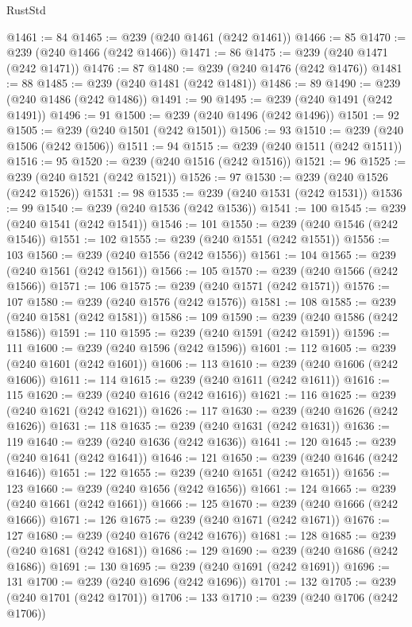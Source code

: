 \begin{lexlean}{RustStd}
\begin{coremodule}
@1461 := 84
@1465 := @239 (@240 @1461 (@242 @1461))
@1466 := 85
@1470 := @239 (@240 @1466 (@242 @1466))
@1471 := 86
@1475 := @239 (@240 @1471 (@242 @1471))
@1476 := 87
@1480 := @239 (@240 @1476 (@242 @1476))
@1481 := 88
@1485 := @239 (@240 @1481 (@242 @1481))
@1486 := 89
@1490 := @239 (@240 @1486 (@242 @1486))
@1491 := 90
@1495 := @239 (@240 @1491 (@242 @1491))
@1496 := 91
@1500 := @239 (@240 @1496 (@242 @1496))
@1501 := 92
@1505 := @239 (@240 @1501 (@242 @1501))
@1506 := 93
@1510 := @239 (@240 @1506 (@242 @1506))
@1511 := 94
@1515 := @239 (@240 @1511 (@242 @1511))
@1516 := 95
@1520 := @239 (@240 @1516 (@242 @1516))
@1521 := 96
@1525 := @239 (@240 @1521 (@242 @1521))
@1526 := 97
@1530 := @239 (@240 @1526 (@242 @1526))
@1531 := 98
@1535 := @239 (@240 @1531 (@242 @1531))
@1536 := 99
@1540 := @239 (@240 @1536 (@242 @1536))
@1541 := 100
@1545 := @239 (@240 @1541 (@242 @1541))
@1546 := 101
@1550 := @239 (@240 @1546 (@242 @1546))
@1551 := 102
@1555 := @239 (@240 @1551 (@242 @1551))
@1556 := 103
@1560 := @239 (@240 @1556 (@242 @1556))
@1561 := 104
@1565 := @239 (@240 @1561 (@242 @1561))
@1566 := 105
@1570 := @239 (@240 @1566 (@242 @1566))
@1571 := 106
@1575 := @239 (@240 @1571 (@242 @1571))
@1576 := 107
@1580 := @239 (@240 @1576 (@242 @1576))
@1581 := 108
@1585 := @239 (@240 @1581 (@242 @1581))
@1586 := 109
@1590 := @239 (@240 @1586 (@242 @1586))
@1591 := 110
@1595 := @239 (@240 @1591 (@242 @1591))
@1596 := 111
@1600 := @239 (@240 @1596 (@242 @1596))
@1601 := 112
@1605 := @239 (@240 @1601 (@242 @1601))
@1606 := 113
@1610 := @239 (@240 @1606 (@242 @1606))
@1611 := 114
@1615 := @239 (@240 @1611 (@242 @1611))
@1616 := 115
@1620 := @239 (@240 @1616 (@242 @1616))
@1621 := 116
@1625 := @239 (@240 @1621 (@242 @1621))
@1626 := 117
@1630 := @239 (@240 @1626 (@242 @1626))
@1631 := 118
@1635 := @239 (@240 @1631 (@242 @1631))
@1636 := 119
@1640 := @239 (@240 @1636 (@242 @1636))
@1641 := 120
@1645 := @239 (@240 @1641 (@242 @1641))
@1646 := 121
@1650 := @239 (@240 @1646 (@242 @1646))
@1651 := 122
@1655 := @239 (@240 @1651 (@242 @1651))
@1656 := 123
@1660 := @239 (@240 @1656 (@242 @1656))
@1661 := 124
@1665 := @239 (@240 @1661 (@242 @1661))
@1666 := 125
@1670 := @239 (@240 @1666 (@242 @1666))
@1671 := 126
@1675 := @239 (@240 @1671 (@242 @1671))
@1676 := 127
@1680 := @239 (@240 @1676 (@242 @1676))
@1681 := 128
@1685 := @239 (@240 @1681 (@242 @1681))
@1686 := 129
@1690 := @239 (@240 @1686 (@242 @1686))
@1691 := 130
@1695 := @239 (@240 @1691 (@242 @1691))
@1696 := 131
@1700 := @239 (@240 @1696 (@242 @1696))
@1701 := 132
@1705 := @239 (@240 @1701 (@242 @1701))
@1706 := 133
@1710 := @239 (@240 @1706 (@242 @1706))

\end{coremodule}
\end{lexlean}
